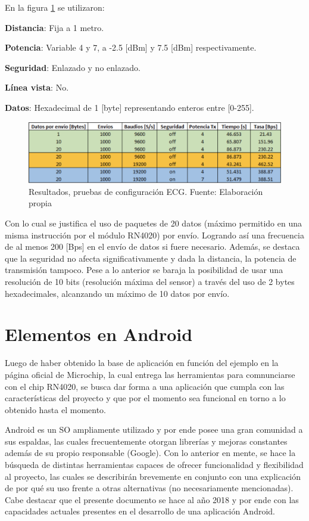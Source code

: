 En la figura \ref{benchmark} se utilizaron:

\textbf{Distancia}:  Fija a 1 metro.

\textbf{Potencia}: Variable 4 y 7, a -2.5 [dBm] y 7.5 [dBm] respectivamente.

\textbf{Seguridad}: Enlazado y no enlazado.

\textbf{Línea vista}: No.

\textbf{Datos}: Hexadecimal de 1 [byte] representando enteros entre [0-255].


\begin{figure}[H]
	\centering
	\includegraphics[scale=0.3]{figuras/proto1/benchmark.png}
	\caption{Resultados, pruebas de configuración ECG. Fuente: Elaboración propia}
	\label{benchmark}
\end{figure}

Con lo cual se justifica el uso de paquetes de 20 datos (máximo permitido en una misma instrucción por el módulo RN4020) por envío. Logrando así una frecuencia de al menos 200 [Bps] en el envío de datos si fuere necesario.
Además, se destaca que la seguridad no afecta significativamente y dada la distancia, la potencia de transmisión tampoco. Pese a lo anterior se baraja la posibilidad de usar una resolución de 10 bits (resolución máxima del sensor) a través del uso de 2 bytes hexadecimales, alcanzando un máximo de 10 datos por envío.

\section{Elementos en Android}

Luego de haber obtenido la base de aplicación en función del ejemplo en la página oficial de Microchip, la cual entrega las herramientas para comnunciarse con el chip RN4020, se busca dar forma a una aplicación que cumpla con las características del proyecto y que por el momento sea funcional en torno a lo obtenido hasta el momento.

Android es un SO ampliamente utilizado y por ende posee una gran comunidad a sus espaldas, las cuales frecuentemente otorgan librerías y mejoras constantes además de su propio responsable (Google). Con lo anterior en mente, se hace la búsqueda de distintas herramientas capaces de ofrecer funcionalidad y flexibilidad al proyecto, las cuales se describirán brevemente en conjunto con una explicación de por qué su uso frente a otras alternativas (no necesariamente mencionadas). Cabe destacar que el presente documento se hace al año 2018 y por ende con las capacidades actuales presentes en el desarrollo de una aplicación Android.\newline

